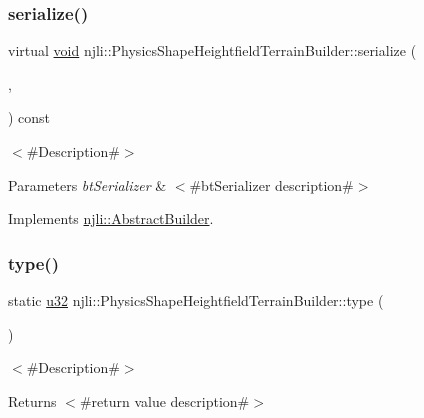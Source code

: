 \subsubsection{\texorpdfstring{serialize()}{serialize()}}
{\footnotesize\ttfamily virtual \mbox{\hyperlink{_thread_8h_af1e856da2e658414cb2456cb6f7ebc66}{void}} njli\+::\+Physics\+Shape\+Heightfield\+Terrain\+Builder\+::serialize (\begin{DoxyParamCaption}\item[{\mbox{\hyperlink{_thread_8h_af1e856da2e658414cb2456cb6f7ebc66}{void}} $\ast$}]{,  }\item[{bt\+Serializer $\ast$}]{ }\end{DoxyParamCaption}) const\hspace{0.3cm}{\ttfamily [virtual]}}

$<$\#\+Description\#$>$


\begin{DoxyParams}{Parameters}
{\em bt\+Serializer} & $<$\#bt\+Serializer description\#$>$ \\
\hline
\end{DoxyParams}


Implements \mbox{\hyperlink{classnjli_1_1_abstract_builder_ab66b774e02ccb9da554c9aab7fa6d981}{njli\+::\+Abstract\+Builder}}.

\mbox{\label{classnjli_1_1_physics_shape_heightfield_terrain_builder_ab9ae03e71c637f08bcb627f36a516ff0}} 
\subsubsection{\texorpdfstring{type()}{type()}}
{\footnotesize\ttfamily static \mbox{\hyperlink{_util_8h_a10e94b422ef0c20dcdec20d31a1f5049}{u32}} njli\+::\+Physics\+Shape\+Heightfield\+Terrain\+Builder\+::type (\begin{DoxyParamCaption}{ }\end{DoxyParamCaption})\hspace{0.3cm}{\ttfamily [static]}}

$<$\#\+Description\#$>$

\begin{DoxyReturn}{Returns}
$<$\#return value description\#$>$ 
\end{DoxyReturn}


